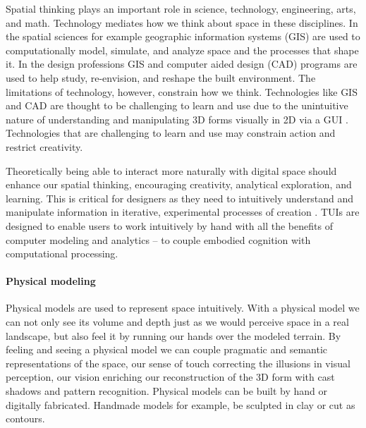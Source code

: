 \documentclass{article}
\begin{document}
Spatial thinking plays an important role in science, technology, engineering, arts, and math. %
Technology mediates how we think about space in these disciplines. 
In the spatial sciences for example geographic information systems (GIS)
are used to computationally model, simulate, and analyze space and the processes that shape it. 
In the design professions GIS and computer aided design (CAD)
programs are used to help study, re-envision, and reshape the built environment.
The limitations of technology, however, constrain how we think.
Technologies like GIS and CAD are thought to be challenging to learn and use 
due to the unintuitive nature of understanding and manipulating 3D forms 
visually in 2D via a GUI \citep{Piper2002a}. 
Technologies that are challenging to learn and use may constrain action and restrict creativity. 



Theoretically being able to interact more naturally with digital space should enhance our spatial thinking, encouraging creativity, analytical exploration, and learning. This is critical for designers as they need to intuitively understand and manipulate information in iterative, experimental processes of creation \citep{Schon1983}.
TUIs are designed to enable users to work intuitively by hand with all the benefits of computer modeling and analytics -- to couple embodied cognition with computational processing. 

\paragraph{Physical modeling}
Physical models are used to represent space intuitively. 
With a physical model we can not only see its volume and depth 
just as we would perceive space in a real landscape, 
but also feel it by running our hands over the modeled terrain. 
By feeling and seeing a physical model we can couple pragmatic and semantic representations of the space, 
our sense of touch correcting the illusions in visual perception, our vision enriching our reconstruction of the 3D form with cast shadows and pattern recognition. 
Physical models can be built by hand or digitally fabricated. 
Handmade models for example, be sculpted in clay or cut as contours. 
\end{document}
